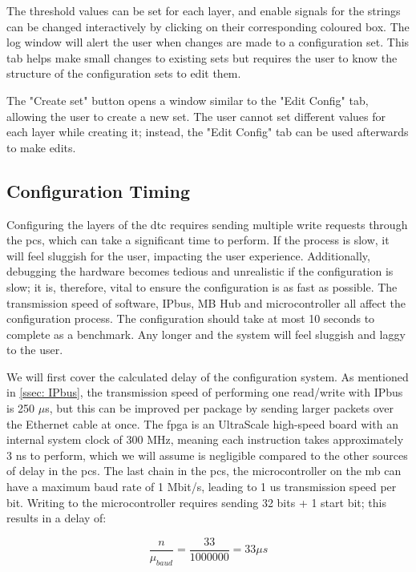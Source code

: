 \documentclass[main.tex]{subfiles}
\begin{document}
The threshold values can be set for each layer, and enable signals for the strings can be changed interactively by clicking on their corresponding coloured box. The log window will alert the user when changes are made to a configuration set. This tab helps make small changes to existing sets but requires the user to know the structure of the configuration sets to edit them.

The "Create set" button opens a window similar to the "Edit Config" tab, allowing the user to create a new set. The user cannot set different values for each layer while creating it; instead, the "Edit Config" tab can be used afterwards to make edits.


\subsection{Configuration Timing}
\label{ssec: con_timing}

Configuring the layers of the \gls{dtc} requires sending multiple write requests through the \gls{pcs}, which can take a significant time to perform. If the process is slow, it will feel sluggish for the user, impacting the user experience. Additionally, debugging the hardware becomes tedious and unrealistic if the configuration is slow; it is, therefore, vital to ensure the configuration is as fast as possible. The transmission speed of software, IPbus, MB Hub and microcontroller all affect the configuration process. The configuration should take at most 10 seconds to complete as a benchmark. Any longer and the system will feel sluggish and laggy to the user.

We will first cover the calculated delay of the configuration system. As mentioned in \autoref{ssec: IPbus}, the transmission speed of performing one read/write with IPbus is 250 $\mu$s, but this can be improved per package by sending larger packets over the Ethernet cable at once. The \gls{fpga} is an UltraScale high-speed board with an internal system clock of 300 MHz, meaning each instruction takes approximately 3 ns to perform, which we will assume is negligible compared to the other sources of delay in the \gls{pcs}. The last chain in the \gls{pcs}, the microcontroller on the \gls{mb} can have a maximum baud rate of 1 Mbit/s, leading to 1 us transmission speed per bit. Writing to the microcontroller requires sending 32 bits + 1 start bit; this results in a delay of: 

\begin{equation} \label{eqn:mu_calculation}
\frac{n}{\mu_{baud}}=\frac{33}{1000000}=33 \mu s
\end{equation}
\end{document}
